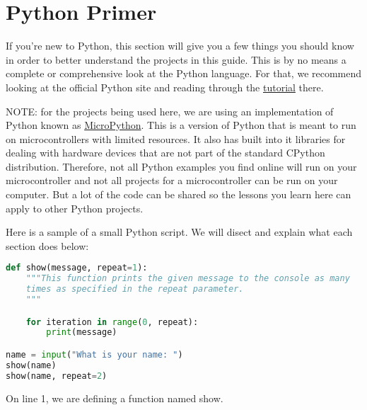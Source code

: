 \chapter{Python Primer}
If you're new to Python, this section will give you a few things you should know
in order to better understand the projects in this guide. This is by no means a
complete or comprehensive look at the Python language. For that, we recommend looking
at the official Python site and reading through the \href{https://docs.python.org/3/tutorial/}{tutorial}
there.
\linebreak

\begin{tcolorbox}
    NOTE: for the projects being used here, we are using an implementation of
    Python known as \href{https://micropython.org/}{MicroPython}. This is a version
    of Python that is meant to run on microcontrollers with limited resources. It
    also has built into it libraries for dealing with hardware devices that are
    not part of the standard CPython distribution. Therefore, not all Python examples
    you find online will run on your microcontroller and not all projects for a
    microcontroller can be run on your computer. But a lot of the code can be shared
    so the lessons you learn here can apply to other Python projects.
\end{tcolorbox}

Here is a sample of a small Python script. We will disect and explain what each
section does below:

\begin{lstlisting}[language=Python,caption=An example Python script]
def show(message, repeat=1):
    """This function prints the given message to the console as many
    times as specified in the repeat parameter.
    """

    for iteration in range(0, repeat):
        print(message)

name = input("What is your name: ")
show(name)
show(name, repeat=2)
\end{lstlisting}

On line 1, we are defining a function named show.